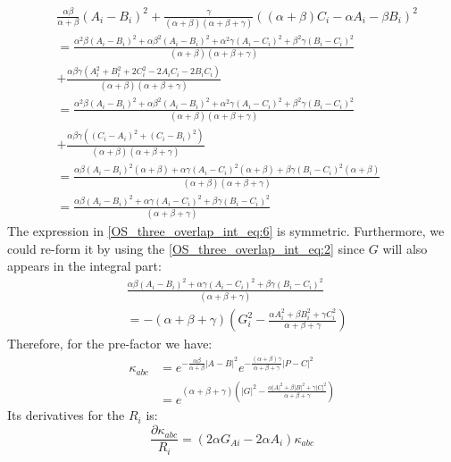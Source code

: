 \begin{equation}
 \begin{split}
  & \frac{\alpha\beta}{\alpha+\beta}(A_{i}-B_{i})^{2}
+ \frac{\gamma}{(\alpha+\beta)(\alpha+\beta+\gamma)}
((\alpha+\beta)C_{i}-\alpha A_{i} - \beta B_{i})^{2} \\
&= \frac{\alpha^{2}\beta(A_{i}-B_{i})^{2} 
+ \alpha\beta^{2}(A_{i}-B_{i})^{2}+
\alpha^{2}\gamma(A_{i}-C_{i})^{2} 
+ \beta^{2}\gamma(B_{i}-C_{i})^{2}}{(\alpha+\beta)(\alpha+\beta+\gamma)} \\
& +\frac{
  \alpha\beta\gamma(A_{i}^{2}+B_{i}^{2}+2C_{i}^{2}-2A_{i}C_{i}-2B_{i}C_{i})}
{(\alpha+\beta)(\alpha+\beta+\gamma)}  \\
&= \frac{\alpha^{2}\beta(A_{i}-B_{i})^{2} 
+ \alpha\beta^{2}(A_{i}-B_{i})^{2}+
\alpha^{2}\gamma(A_{i}-C_{i})^{2} 
+ \beta^{2}\gamma(B_{i}-C_{i})^{2}}{(\alpha+\beta)(\alpha+\beta+\gamma)} \\
&+\frac{
  \alpha\beta\gamma\left( (C_{i}-A_{i})^{2} + (C_{i}-B_{i})^{2}\right)}
{(\alpha+\beta)(\alpha+\beta+\gamma)} \\
&= \frac{\alpha\beta(A_{i}-B_{i})^{2}(\alpha+\beta) +
\alpha\gamma(A_{i}-C_{i})^{2}(\alpha+\beta) 
+ \beta\gamma(B_{i}-C_{i})^{2}(\alpha+\beta)}
{(\alpha+\beta)(\alpha+\beta+\gamma)} \\
&= \frac{\alpha\beta(A_{i}-B_{i})^{2} +
\alpha\gamma(A_{i}-C_{i})^{2} 
+ \beta\gamma(B_{i}-C_{i})^{2}}
{(\alpha+\beta+\gamma)}
 \end{split}
\label{OS_three_overlap_int_eq:6}
\end{equation}
The expression in \ref{OS_three_overlap_int_eq:6} is symmetric. Furthermore, we 
could re-form it by using the \ref{OS_three_overlap_int_eq:2} since $G$ will also
appears in the integral part:
\begin{equation}
 \begin{split}
 &\frac{\alpha\beta(A_{i}-B_{i})^{2} + \alpha\gamma(A_{i}-C_{i})^{2}  +
\beta\gamma(B_{i}-C_{i})^{2}}
 {(\alpha+\beta+\gamma)} \\
&= -(\alpha+\beta+\gamma)\left( G_{i}^{2} - \frac{\alpha A_{i}^{2} + \beta
B_{i}^{2} + \gamma C_{i}^{2}}
{\alpha+\beta+\gamma}\right)  
 \end{split}
\label{OS_three_overlap_int_eq:7}
\end{equation}
Therefore, for the pre-factor we have:
\begin{align}
\kappa_{abc} &= e^{-\frac{\alpha\beta}{\alpha+\beta}|A-B|^{2}}
e^{-\frac{(\alpha+\beta)\gamma}{\alpha+\beta+\gamma}|P-C|^{2}} \nonumber \\
&= e^{(\alpha+\beta+\gamma)\left( |G|^{2} - \frac{\alpha |A|^{2} + \beta |B|^{2} + \gamma |C|^{2}}
{\alpha+\beta+\gamma}\right)}
\label{OS_three_overlap_int_eq:8}
\end{align}
Its derivatives for the $R_{i}$ is:
\begin{equation}
 \label{OS_three_overlap_int_eq:9}
\frac{\partial \kappa_{abc}}{R_{i}} = (2\alpha G_{Ai} - 2\alpha
A_{i})\kappa_{abc}
\end{equation}

